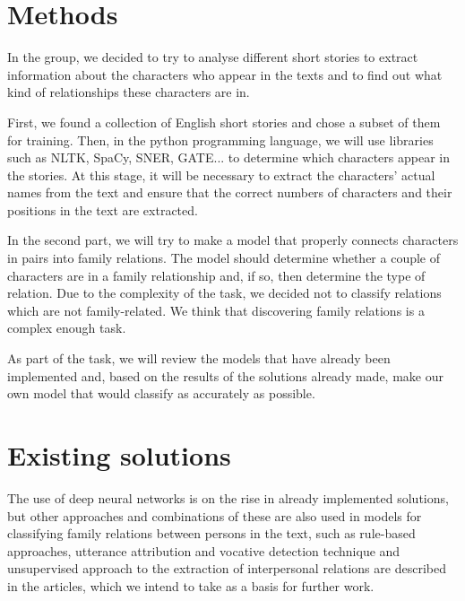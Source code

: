 \documentclass[fleqn,moreauthors,10pt]{ds_report}
\begin{document}
\section*{Methods}

In the group, we decided to try to analyse different short stories to extract information about the characters who appear in the texts and to find out what kind of relationships these characters are in.

First, we found a collection of English short stories and chose a subset of them for training. Then, in the python programming language, we will use libraries such as NLTK, SpaCy, SNER, GATE... to determine which characters appear in the stories. At this stage, it will be necessary to extract the characters' actual names from the text and ensure that the correct numbers of characters and their positions in the text are extracted.

In the second part, we will try to make a model that properly connects characters in pairs into family relations. The model should determine whether a couple of characters are in a family relationship and, if so, then determine the type of relation. Due to the complexity of the task, we decided not to classify relations which are not family-related. We think that discovering family relations is a complex enough task.

As part of the task, we will review the models that have already been implemented and, based on the results of the solutions already made, make our own model that would classify as accurately as possible.




\section*{Existing solutions}

The use of deep neural networks is on the rise in already implemented solutions, but other approaches and combinations of these are also used in models for classifying family relations between persons in the text, such as rule-based approaches, utterance attribution and vocative detection technique and unsupervised approach to the extraction of interpersonal relations are described in the articles, which we intend to take as a basis for further work.
\end{document}
